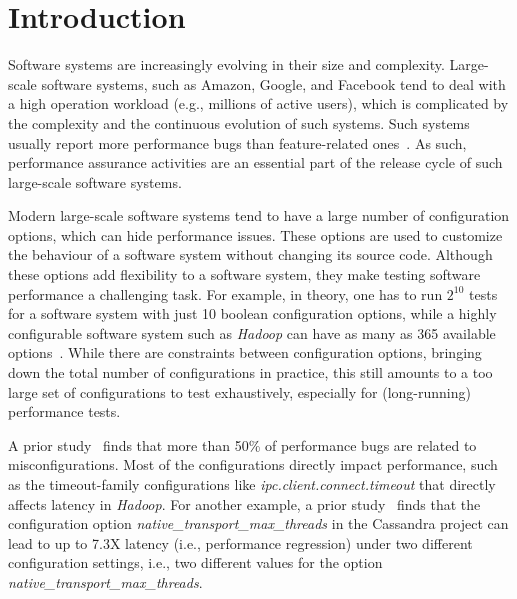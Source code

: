 
\section{Introduction}
\label{sec:intro}
Software systems are increasingly evolving in their size and complexity.
Large-scale software systems, such as Amazon, Google, and Facebook tend to deal with a high operation workload (e.g., millions of active users), which is complicated by the complexity and the continuous evolution of such systems. Such systems usually report more performance bugs than feature-related ones~\cite{weyuker2000experience}. As such, performance assurance activities are an essential part of the release cycle of such large-scale software systems.

Modern large-scale software systems tend to have a large number of configuration options, which can hide performance issues. %
These options are used to customize the behaviour of a software system without changing its source code. Although these options add flexibility to a software system, they make testing software performance a challenging task. For example, in theory, one has to run $2^
{10}$ tests for a software system with just 10 boolean configuration options, while a highly configurable software system such as \emph{Hadoop} can have as many as 365 available options~\cite{tse}. While there are constraints between configuration options, bringing down the total number of configurations in practice, this still amounts to a too large set of configurations to test exhaustively, especially for (long-running) performance tests.
 

A prior study~\cite{RN2864} finds that more than 50\% of performance bugs are related to misconfigurations. Most of the configurations directly impact performance, such as the timeout-family configurations like \emph{ipc.client.connect.timeout} that directly affects latency in \emph{Hadoop}. For another example, a prior study~\cite{DBLP:conf/eurosys/LiWHL20} finds that the configuration option \emph{native\_transport\_max\_threads} in the Cassandra project can lead to up to 7.3X latency (i.e., performance regression) under two different configuration settings, i.e., two different values for the option \emph{native\_transport\_max\_threads}.

